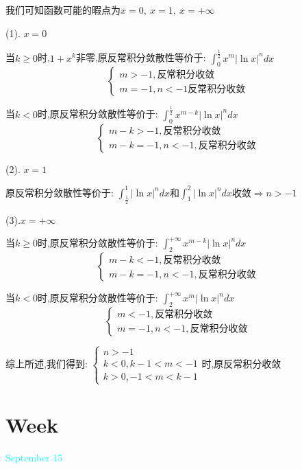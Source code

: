 \begin{solution}

	我们可知函数可能的暇点为$x=0,\ x=1,\ x=+\infty$
	
	(1). $x=0$
	
	当$k\geq 0$时,$1+x^{k}$非零,原反常积分敛散性等价于:  $\int_{0}^{\frac{1}{2}}x^{m}|\ln x|^ndx$
	$$\left\lbrace
	\begin{array}{l}
		m>-1,\text{反常积分收敛}\\
		m=-1,n<-1\text{反常积分收敛}
	\end{array}
	\right. $$
	
	当$k<0$时,原反常积分敛散性等价于:  $\int_{0}^{\frac{1}{2}}x^{m-k}|\ln x|^ndx$
	$$\left\lbrace
	\begin{array}{l}
		m-k>-1,\text{反常积分收敛}\\
		m-k=-1,n<-1,\text{反常积分收敛}
	\end{array}
	\right. $$
	
	(2). $x=1$
	
	原反常积分敛散性等价于:  $\int_{\frac{1}{2}}^{1}|\ln x|^ndx$和$\int_{1}^{2}|\ln x|^ndx$收敛$\Rightarrow n>-1$
	
	(3).$x=+\infty$
	
	当$k\geq 0$时,原反常积分敛散性等价于:  $\int_{2}^{+\infty}x^{m-k}|\ln x|^ndx$
	$$\left\lbrace
	\begin{array}{l}
		m-k<-1,\text{反常积分收敛}\\
		m-k=-1,n<-1,\text{反常积分收敛}
	\end{array}
	\right. $$
	
	当$k<0$时,原反常积分敛散性等价于:  $\int_{2}^{+\infty}x^{m}|\ln x|^ndx$
	$$\left\lbrace
	\begin{array}{l}
		m<-1,\text{反常积分收敛}\\
		m=-1,n<-1,\text{反常积分收敛}
	\end{array}
	\right. $$
	
	综上所述,我们得到:  $\left\lbrace
	\begin{array}{l}
		n>-1\\
		k<0,k-1<m<-1\\
		k>0,-1<m<k-1
	\end{array}
	\right. $时,原反常积分收敛
\end{solution}


\section{Week }
\textcolor{cyan}{September 15}

